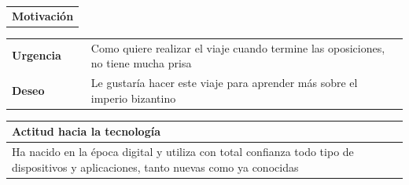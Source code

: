 \documentclass[11pt]{article}
\begin{document}
\begin{table}[H]
  \begin{tabular}{l}
    \textbf{Motivación} 
  \end{tabular}

  \begin{tabular}{p{0.2\linewidth}|p{0.8\linewidth}}
    \toprule
    \textbf{Urgencia} & Como quiere realizar el viaje cuando termine las oposiciones, no tiene mucha prisa\\
    \textbf{Deseo}  & Le gustaría hacer este viaje para aprender más sobre el imperio bizantino \\
    \bottomrule
  \end{tabular}

  \begin{tabular}{p{1.028\linewidth}}
    \textbf{Actitud hacia la tecnología}\\
    \midrule
    Ha nacido en la época digital y utiliza con total confianza todo tipo de dispositivos y aplicaciones, tanto nuevas como ya conocidas
  \end{tabular}
\end{table}
\end{document}

